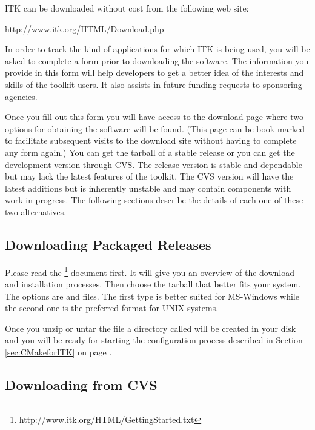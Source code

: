 ITK can be downloaded without cost from the following web site:
\begin{center} 
  \url{http://www.itk.org/HTML/Download.php}
\end{center}
In order to track the kind of applications for which ITK is being used, you
will be asked to complete a form prior to downloading the software.
The information you provide in this form will help developers to get a better
idea of the interests and skills of the toolkit users. It also assists in 
future funding requests to sponsoring agencies.

Once you fill out this form you will have access to the download page where two
options for obtaining the software will be found. (This page can be
book marked to facilitate subsequent visits to the download site without
having to complete any form again.) You can get the tarball of a stable
release or you can get the development version through CVS.  The release
version is stable and dependable but may lack the latest features of the
toolkit. The CVS version will have the latest additions but is inherently
unstable and may contain components with work in progress.  The following
sections describe the details of each one of these two alternatives.

\subsection{Downloading Packaged Releases}
\label{sec:DownloadingReleases}


Please read the
\footnote{http://www.itk.org/HTML/GettingStarted.txt}
document first. It will give you an overview of the download and installation
processes. Then choose the tarball that better fits your system. The options
are  and  files.  The first type is better suited for
MS-Windows while the second one is the preferred format for UNIX systems.

Once you unzip or untar the file a directory called  will be
created in your disk and you will be ready for starting the configuration
process described in Section \ref{sec:CMakeforITK} on page 
\pageref{sec:CMakeforITK}.

\subsection{Downloading from CVS}
\label{sec:DownloadingFromCVS}

